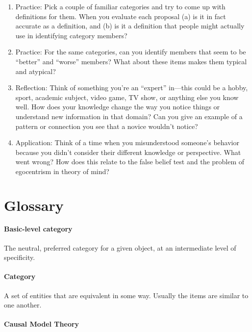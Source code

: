 \documentclass[
]{krantz}
\providecommand{\tightlist}{%
  \setlength{\itemsep}{0pt}\setlength{\parskip}{0pt}}
\begin{document}
\begin{enumerate}
\def\labelenumi{\arabic{enumi}.}
\tightlist
\item
  Practice: Pick a couple of familiar categories and try to come up with definitions for them. When you evaluate each proposal (a) is it in fact accurate as a definition, and (b) is it a definition that people might actually use in identifying category members?
\item
  Practice: For the same categories, can you identify members that seem to be ``better'' and ``worse'' members? What about these items makes them typical and atypical?
\item
  Reflection: Think of something you're an ``expert'' in---this could be a hobby, sport, academic subject, video game, TV show, or anything else you know well. How does your knowledge change the way you notice things or understand new information in that domain? Can you give an example of a pattern or connection you see that a novice wouldn't notice?
\item
  Application: Think of a time when you misunderstood someone's behavior because you didn't consider their different knowledge or perspective. What went wrong? How does this relate to the false belief test and the problem of egocentrism in theory of mind?
\end{enumerate}

\section{Glossary}\label{glossary-6}

\paragraph*{Basic-level category}\label{basic-level-category}

The neutral, preferred category for a given object, at an intermediate level of specificity.

\paragraph*{Category}\label{category}

A set of entities that are equivalent in some way. Usually the items are similar to one another.

\paragraph*{Causal Model Theory}\label{causal-model-theory}
\end{document}
